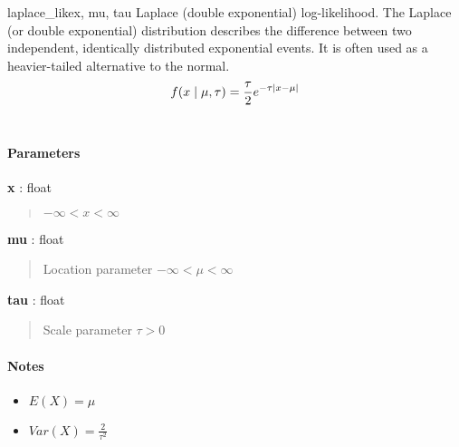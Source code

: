 \hypertarget{pymc.distributions.laplace_like}{}
\begin{funcdesc}{laplace\_like}{x, mu, tau}
Laplace (double exponential) log-likelihood. The Laplace (or double exponential) distribution describes the
difference between two independent, identically distributed exponential
events. It is often used as a heavier-tailed alternative to the normal.
\begin{gather}
\begin{split}f(x \mid \mu, \tau) = \frac{\tau}{2}e^{-\tau|x-\mu|}\end{split}\notag\\\begin{split}\end{split}\notag
\end{gather}\paragraph{Parameters}\begin{paramlist}

\item[] \textbf{x} : float
\begin{quote}

$-\infty < x < \infty$
\end{quote}

\item[] \textbf{mu} : float
\begin{quote}

Location parameter $-\infty < \mu < \infty$
\end{quote}

\item[] \textbf{tau} : float
\begin{quote}

Scale parameter $\tau > 0$
\end{quote}
\end{paramlist}
\paragraph{Notes}
\begin{itemize}
\item {}
$E(X) = \mu$

\item {}
$Var(X) = \frac{2}{\tau^2}$

\end{itemize}
\end{funcdesc}

